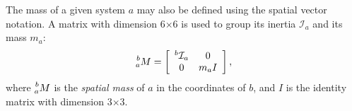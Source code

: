 \documentclass[tog]{acmsiggraph}
\begin{document}
The mass of a given system $a$ may also be defined using the spatial vector notation. A matrix with dimension 6$\times$6 is used to group its inertia $\mathcal{I}_a$ and its mass $m_a$:
%
\begin{equation}
  \prescript{b}{a}{M} = \left[ \begin{array}{cc} {^b\mathcal{I}_a} & 0 \\ 0 & m_{a} I \end{array} \right],
  \label{eq:inerciamassa}
\end{equation}
%
where $\prescript{b}{a}{M}$ is the \emph{spatial mass} of $a$ in the coordinates of $b$, and $I$ is the identity matrix with dimension 3$\times$3.











\end{document}
